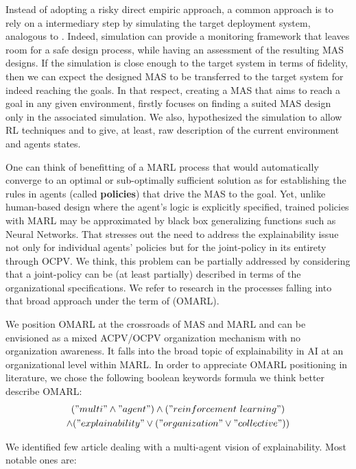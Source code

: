 \documentclass{ecai}
\begin{document}
Instead of adopting a risky direct empiric approach, a common approach is to rely on a intermediary step by simulating the target deployment system, analogous to . Indeed, simulation can provide a monitoring framework that leaves room for a safe design process, while having an assessment of the resulting MAS designs. If the simulation is close enough to the target system in terms of fidelity, then we can expect the designed MAS to be transferred to the target system for indeed reaching the goals.
In that respect, creating a MAS that aims to reach a goal in any given environment, firstly focuses on finding a suited MAS design only in the associated simulation. We also, hypothesized the simulation to allow RL techniques and to give, at least, raw description of the current environment and agents states.

One can think of benefitting of a MARL process that would automatically converge to an optimal or sub-optimally sufficient solution as for establishing the rules in agents (called \textbf{policies}) that drive the MAS to the goal. Yet, unlike human-based design where the agent's logic is explicitly specified, trained policies with MARL may be approximated by black box generalizing functions such as Neural Networks. That stresses out the need to address the explainability issue not only for individual agents' policies but for the joint-policy in its entirety through OCPV. We think, this problem can be partially addressed by considering that a joint-policy can be (at least partially) described in terms of the organizational specifications. We refer to research in the processes falling into that broad approach under the term of  (OMARL).

We position OMARL at the crossroads of MAS and MARL and can be envisioned as a mixed ACPV/OCPV organization mechanism with no organization awareness. It falls into the broad topic of explainability in AI at an organizational level within MARL. In order to appreciate OMARL positioning in literature, we chose the following boolean keywords formula we think better describe OMARL:
\begin{gather*}
    ("multi" \land "agent") \land ("reinforcement \ learning")\\ \land ("explainability" \lor ("organization" \lor "collective"))
\end{gather*}

We identified few article dealing with a multi-agent vision of explainability. Most notable ones are:
\end{document}

